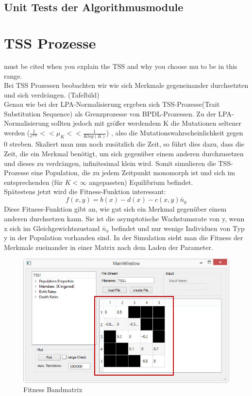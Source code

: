 \documentclass[11pt, a4paper, german]{article}
\begin{document}
	\subsection{Unit Tests der Algorithmusmodule}

\clearpage
\section{TSS Prozesse}

\cite{freidlin2012random} must be cited when you explain the TSS and why you choose mu to be in this range.\\
Bei TSS Prozessen beobachten wir wie sich Merkmale gegeneinander durchsetzten und sich verdrängen. (Tafelbild)\\
Genau wie bei der LPA-Normalisierung ergeben sich TSS-Prozesse(Trait Substitution Sequence) als Grenzprozesse von BPDL-Prozessen. Zu der LPA-Normalisierung sollten jedoch mit größer werdendem K die Mutationen seltener werden ($ \frac{1}{e^{VK}} << \mu_K << \frac{1}{K log(K)} $) , also die Mutationswahrscheinlichkeit gegen 0 streben. Skaliert man nun noch zusätzlich die Zeit, so führt dies dazu, dass die Zeit, die ein Merkmal benötigt, um sich gegenüber einem anderen durchzusetzen und dieses zu verdrängen, infinitesimal klein wird. Somit simulieren die TSS-Prozesse eine Population, die zu jedem Zeitpunkt monomorph ist und sich im entsprechenden (für $ K < \infty $ angepassten) Equilibrium befindet.\\
Spätestens jetzt wird die Fitness-Funktion interessant:
\[ f(x,y) = b(x) - d(x) - c(x,y)\bar{n}_y \]
Diese Fitness-Funktion gibt an, wie gut sich ein Merkmal gegenüber einem anderen durchsetzen kann. Sie ist die asymptotische Wachstumsrate von y, wenn x sich im Gleichgewichtszustand $ \bar{n}_x $ befindet und nur wenige Individuen von Typ y in der Population vorhanden sind. In der Simulation sieht man die Fitness der Merkmale zueinander in einer Matrix nach dem Laden der Parameter.
\begin{figure}[H]
	\centering
	\includegraphics[width=0.7\linewidth]{./Pictures/MainWindow_BandMatrix}
	\caption[Fitness Matrix]{Fitness Bandmatrix}
	\label{MainWindow mit Fitness Bandmatrix}
\end{figure}
\end{document}
